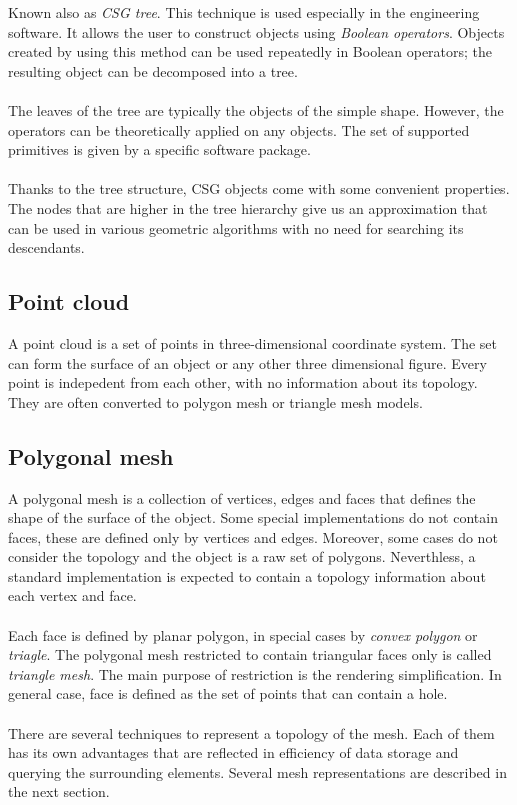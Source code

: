 Known also as \emph{CSG tree}\cite{Zara2004}. This technique is used especially
in the engineering software. It allows
the user to construct objects using \emph{Boolean operators}. Objects created by using this
method can be used repeatedly in Boolean operators; the resulting object can be decomposed into a tree.
\\
\\
The leaves of the tree are typically the objects of the simple shape. However, the operators can be
theoretically applied on any objects. The set of supported primitives is given by a specific
software package.
\\
\\
Thanks to the tree structure, CSG objects come with some convenient properties. The nodes that
are higher in the tree hierarchy give us an approximation that can be used in various geometric
algorithms with no need for searching its descendants.

\subsection{Point cloud}

A point cloud is a set of points in three-dimensional coordinate system\cite{Zara2004}\cite{Agarwal2006}.
The set can form the surface
of an object or any other three dimensional figure. Every point is indepedent
from each other, with no information about its topology. They are often converted to polygon mesh
or triangle mesh models.

\subsection{Polygonal mesh}

A polygonal mesh is a collection of vertices, edges and faces that defines the shape of the surface of
the object\cite{Zara2004}. Some special implementations do not contain faces, these are
defined only by vertices and
edges. Moreover, some cases do not consider the topology and the object is a raw set of polygons.
Neverthless, a standard implementation is expected to contain a topology information about each vertex
and face.
\\
\\
Each face is defined by planar polygon, in special cases by \emph{convex polygon} or \emph{triagle}.
The polygonal mesh restricted to contain triangular faces only is called \emph{triangle mesh}.
The main purpose of restriction is the rendering simplification. In general case, face is defined
as the set of points that can contain a hole.
\\
\\
There are several techniques to represent a topology of the mesh. Each of them has its own advantages
that are reflected in efficiency of data storage and querying the surrounding elements. Several
mesh representations are described in the next section.

